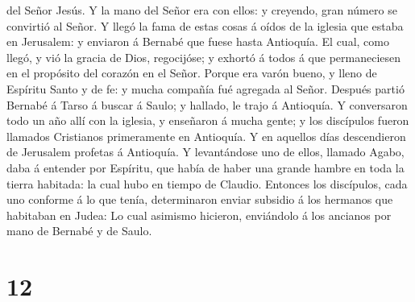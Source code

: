 del Señor Jesús.  Y la mano del Señor era con ellos: y
creyendo, gran número se convirtió al Señor.  Y llegó la
fama de estas cosas á oídos de la iglesia que estaba en Jerusalem: y
enviaron á Bernabé que fuese hasta Antioquía.  El cual,
como llegó, y vió la gracia de Dios, regocijóse; y exhortó á todos á que
permaneciesen en el propósito del corazón en el Señor. 
Porque era varón bueno, y lleno de Espíritu Santo y de fe: y mucha
compañía fué agregada al Señor.  Después partió Bernabé á
Tarso á buscar á Saulo; y hallado, le trajo á Antioquía. 
Y conversaron todo un año allí con la iglesia, y enseñaron á mucha
gente; y los discípulos fueron llamados Cristianos primeramente en
Antioquía.  Y en aquellos días descendieron de Jerusalem
profetas á Antioquía.  Y levantándose uno de ellos,
llamado Agabo, daba á entender por Espíritu, que había de haber una
grande hambre en toda la tierra habitada: la cual hubo en tiempo de
Claudio.  Entonces los discípulos, cada uno conforme á lo
que tenía, determinaron enviar subsidio á los hermanos que habitaban en
Judea:  Lo cual asimismo hicieron, enviándolo á los
ancianos por mano de Bernabé y de Saulo.

\hypertarget{section-11}{%
\section{12}\label{section-11}}

